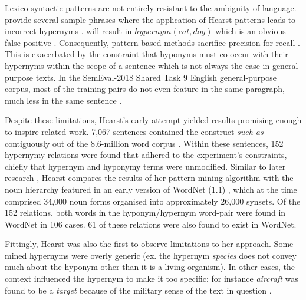 Lexico-syntactic patterns are not entirely resistant to the ambiguity of language.  \citeauthor{wu2012probase} provide several sample phrases where the application of Hearst patterns leads to incorrect hypernyms \citep{wu2012probase}.   will result in \(hypernym(cat, dog)\) which is an obvious false positive \citep{wu2012probase}.  Consequently, pattern-based methods sacrifice precision for recall \citep{Wang2017, Snow2004, ritter2009anyway}.  This is exacerbated by the constraint that hyponyms must co-occur with their hypernyms within the scope of a sentence which is not always the case in general-purpose texts.  In the SemEval-2018 Shared Task 9 \citep{camacho2018semeval} English general-purpose corpus, most of the training pairs do not even feature in the same paragraph, much less in the same sentence \citep{bernier2018crim}.


Despite these limitations, Hearst’s early attempt yielded results promising enough to inspire related work.  7,067 sentences contained the construct \textit{such as} contiguously out of the 8.6-million word corpus \citep{grolier1990academic}.  Within these sentences, 152 hypernymy relations were found that adhered to the experiment’s constraints, chiefly that hypernym and hyponymy terms were unmodified.  Similar to later research \citep{kozareva2010semi}, Hearst compares the results of her pattern-mining algorithm with the noun hierarchy featured in an early version of WordNet (1.1) \citep{Miller1995}, which at the time comprised 34,000 noun forms organised into approximately 26,000 \ac{synset}s.  Of the 152 relations, both words in the hyponym/hypernym word-pair were found in WordNet in 106 cases.  61 of these relations were also found to exist in WordNet.  

Fittingly, Hearst was also the first to observe limitations to her approach.  Some mined hypernyms were overly generic (ex. the hypernym \textit{species} does not convey much about the hyponym other than it is a living organism).  In other cases, the context influenced the hypernym to make it too specific; for instance \textit{aircraft} was found to be a \textit{target} because of the military sense of the text in question \citep{hearst1992automatic}.

